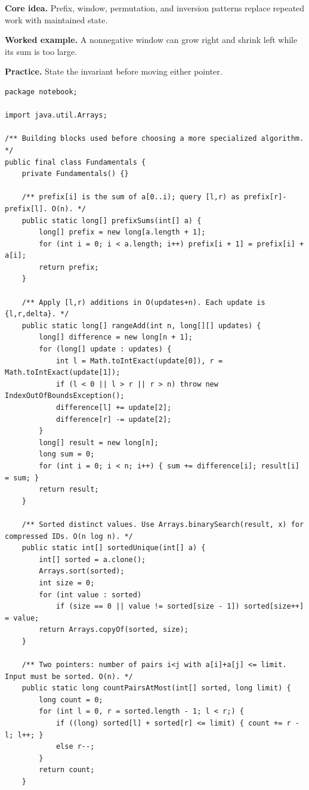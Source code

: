 \documentclass[10pt,letterpaper]{article}
\begin{document}
\noindent\textbf{Core idea.} Prefix, window, permutation, and inversion patterns replace repeated work with maintained state.\par
\noindent\textbf{Worked example.} A nonnegative window can grow right and shrink left while its sum is too large.\par
\noindent\textbf{Practice.} State the invariant before moving either pointer.\par
\begin{lstlisting}
package notebook;

import java.util.Arrays;

/** Building blocks used before choosing a more specialized algorithm. */
public final class Fundamentals {
    private Fundamentals() {}

    /** prefix[i] is the sum of a[0..i); query [l,r) as prefix[r]-prefix[l]. O(n). */
    public static long[] prefixSums(int[] a) {
        long[] prefix = new long[a.length + 1];
        for (int i = 0; i < a.length; i++) prefix[i + 1] = prefix[i] + a[i];
        return prefix;
    }

    /** Apply [l,r) additions in O(updates+n). Each update is {l,r,delta}. */
    public static long[] rangeAdd(int n, long[][] updates) {
        long[] difference = new long[n + 1];
        for (long[] update : updates) {
            int l = Math.toIntExact(update[0]), r = Math.toIntExact(update[1]);
            if (l < 0 || l > r || r > n) throw new IndexOutOfBoundsException();
            difference[l] += update[2];
            difference[r] -= update[2];
        }
        long[] result = new long[n];
        long sum = 0;
        for (int i = 0; i < n; i++) { sum += difference[i]; result[i] = sum; }
        return result;
    }

    /** Sorted distinct values. Use Arrays.binarySearch(result, x) for compressed IDs. O(n log n). */
    public static int[] sortedUnique(int[] a) {
        int[] sorted = a.clone();
        Arrays.sort(sorted);
        int size = 0;
        for (int value : sorted)
            if (size == 0 || value != sorted[size - 1]) sorted[size++] = value;
        return Arrays.copyOf(sorted, size);
    }

    /** Two pointers: number of pairs i<j with a[i]+a[j] <= limit. Input must be sorted. O(n). */
    public static long countPairsAtMost(int[] sorted, long limit) {
        long count = 0;
        for (int l = 0, r = sorted.length - 1; l < r;) {
            if ((long) sorted[l] + sorted[r] <= limit) { count += r - l; l++; }
            else r--;
        }
        return count;
    }


\end{lstlisting}
\end{document}
